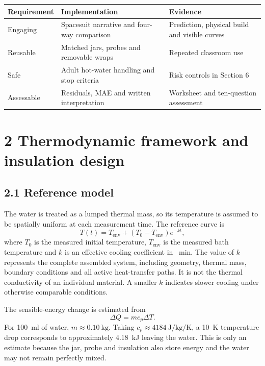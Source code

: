 \documentclass[9pt,a4paper]{extarticle}
\newcommand{\Tenv}{T_{\mathrm{env}}}
\newcommand{\Tzero}{T_{0}}
\begin{document}
\begin{center}\small
\begin{tabularx}{\columnwidth}{|>{\raggedright\arraybackslash}X|>{\raggedright\arraybackslash}X|>{\raggedright\arraybackslash}X|}\hline
\textbf{Requirement} & \textbf{Implementation} & \textbf{Evidence} \\ \hline
Engaging & Spacesuit narrative and four-way comparison & Prediction, physical build and visible curves \\ \hline
Reusable & Matched jars, probes and removable wraps & Repeated classroom use \\ \hline
Safe & Adult hot-water handling and stop criteria & Risk controls in Section 6 \\ \hline
Assessable & Residuals, MAE and written interpretation & Worksheet and ten-question assessment \\ \hline
\end{tabularx}
\end{center}
\section*{2 Thermodynamic framework and insulation design}
\subsection*{2.1 Reference model}
The water is treated as a lumped thermal mass, so its temperature is assumed to be spatially uniform at each measurement time. The reference curve is
\begin{equation}
  T(t)=T_{\mathrm{env}}+\left(T_0-T_{\mathrm{env}}\right)e^{-kt},
  \label{eq:newton}
\end{equation}
where $\Tzero$ is the measured initial temperature, $\Tenv$ is the measured bath temperature and $k$ is an effective cooling coefficient in \si{\per\minute}. The value of $k$ represents the complete assembled system, including geometry, thermal mass, boundary conditions and all active heat-transfer paths. It is not the thermal conductivity of an individual material. A smaller $k$ indicates slower cooling under otherwise comparable conditions.

The sensible-energy change is estimated from
\begin{equation}
  \Delta Q = m c_p \Delta T.
  \label{eq:energy}
\end{equation}
For \SI{100}{\milli\litre} of water, $m\approx\SI{0.10}{\kilogram}$. Taking $c_p\approx\SI{4184}{\joule\per\kilogram\per\kelvin}$, a \SI{10}{\kelvin} temperature drop corresponds to approximately \SI{4.18}{\kilo\joule} leaving the water. This is only an estimate because the jar, probe and insulation also store energy and the water may not remain perfectly mixed.
\end{document}
